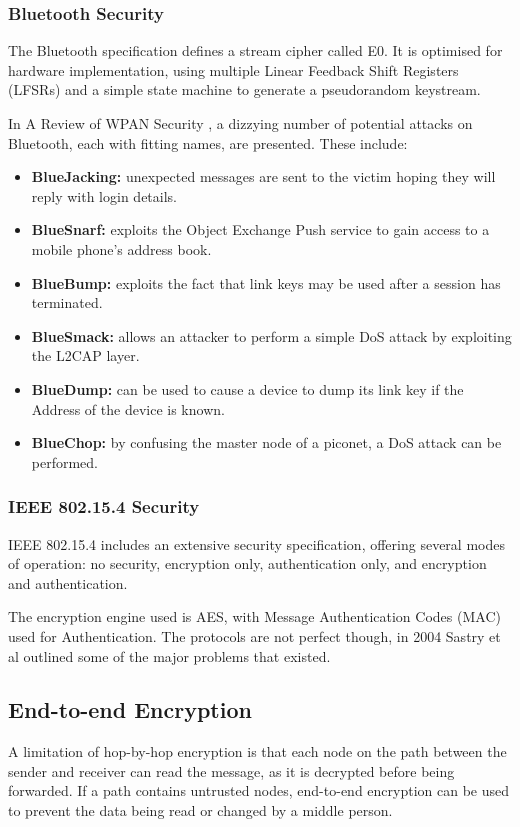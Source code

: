 \documentclass[10pt,journal,compsoc]{IEEEtran}
\begin{document}
\subsubsection{Bluetooth Security}
The Bluetooth specification \cite{BTSpec} defines a stream cipher called E0.
It is optimised for  hardware implementation, using multiple Linear Feedback
Shift Registers (LFSRs) and a simple state machine to generate a pseudorandom
keystream. 

In A Review of WPAN Security \cite{Kennedy2008}, a dizzying number of potential
attacks on Bluetooth, each with fitting names, are presented. These include: 
\begin{itemize}[$\bullet$]
\item {\bf BlueJacking:} unexpected messages are sent to the victim hoping they
will reply with login details. 
\item {\bf BlueSnarf:} exploits the Object Exchange Push service to gain
access to a mobile phone's address book. 
\item {\bf BlueBump:} exploits the fact that link keys may be used after a session
has terminated. 
\item {\bf BlueSmack:} allows an attacker to perform a simple DoS attack by
exploiting the L2CAP layer.
\item {\bf BlueDump:} can be used to cause a device to dump its link key if the
 Address of the device is known. 
\item {\bf BlueChop:} by confusing the master node of a piconet, a DoS attack can be
performed. 
\end{itemize}

\subsubsection{IEEE 802.15.4 Security}
IEEE 802.15.4 includes an extensive security specification, offering several
modes of operation: no security, encryption only, authentication only, and
encryption and authentication. 

The encryption engine used is AES, with Message Authentication Codes (MAC) used
for Authentication. The protocols are not perfect though, in 2004 Sastry et al
\cite{Sastry2004} outlined some of the major problems that existed.  


\subsection{End-to-end Encryption}
A limitation of hop-by-hop encryption is that each node on the path between the
sender and receiver can read the message, as it is decrypted before being
forwarded. If a path contains untrusted nodes, end-to-end encryption can be
used to prevent the data being read or changed by a middle person. 
\end{document}
